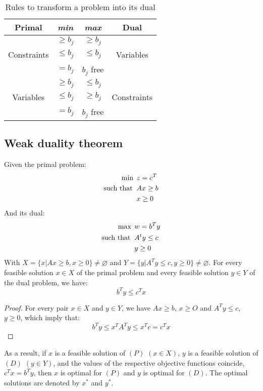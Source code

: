 \begin{table}[H]
    \centering
    \begin{tabular}{c|c|c|c}
        \textbf{Primal} & \textit{min} & \textit{max} & \textbf{Dual} \\ \hline
                    & $\geq b_j$    & $\geq b_j$            & \\ 
        Constraints & $\leq b_j$    & $\leq b_j$            & Variables\\ 
                    & $= b_j$       & $b_j$ free            & \\ \hline
                    & $\geq b_j$    & $\leq b_j$            & \\ 
        Variables   & $\leq b_j$    & $\geq b_j$            & Constraints \\ 
                    & $= b_j$       & $b_j$ free            & \\ 
    \end{tabular}
    \caption{Rules to transform a problem into its dual}
\end{table}

\subsection{Weak duality theorem}
\begin{theorem}
    Given the primal problem: 
    \begin{align*}
        \min                      \:&\: z=c^T            \\
        \textnormal{such that }     &\: Ax\geq b         \\
                                    &\: x \geq 0
    \end{align*}
    And its dual: 
    \begin{align*}
        \max                      \:&\: w=b^Ty              \\
        \textnormal{such that }     &\: A^ty\leq c          \\
                                    &\: y \geq 0
    \end{align*}
    With $X=\{x|Ax \geq b, x \geq 0\} \neq \varnothing$ and $Y=\{y|A^Ty \leq c, y \geq 0\} \neq \varnothing$.
    For every feasible solution $x \in X$ of the primal problem and every feasible solution $y \in Y$ of the dual problem, we have: 
    \[b^Ty \leq c^Tx\]
\end{theorem}
\begin{proof}
    For every pair $x \in X$ and $y \in Y$, we have $Ax \geq b$, $x \geq O$ and $A^Ty \leq c$, $y \geq 0$, which imply that: 
    \[b^Ty \leq x^TA^Ty \leq x^Tc=c^Tx\]
\end{proof}
As a result, if $x$ is a feasible solution of $(P)$ $(x \in X)$, $y$ is a feasible solution of $(D)$ $(y \in Y)$, and the values of the respective objective functions coincide, $c^Tx=b^Ty$, then $x$ is optimal for $(P)$ and $y$ is optimal for $(D)$.
The optimal solutions are denoted by $x^{*}$ and $y^{*}$. 

